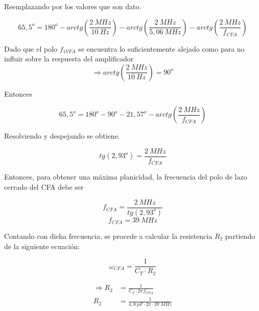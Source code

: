 \bigskip
\hspace{1mm} Reemplazando por los valores que son dato.

\begin{equation}
    65,5^o = 180^o - arctg \left(\frac{2~MHz}{10~Hz}\right) - arctg \left(\frac{2~MHz}{5,06~MHz}\right) - arctg \left(\frac{2~MHz}{f_{CFA}}\right)
\end{equation}

\bigskip
\hspace{1mm} Dado que el polo $ f_{1VFA} $ se encuentra lo suficientemente alejado como para no influir sobre la respuesta del amplificador
\begin{equation}
    \Longrightarrow arctg \left(\frac{2~MHz}{10~Hz}\right) = 90^o
\end{equation}

\hspace{1mm} Entonces

\begin{equation}
    65,5^o = 180^o - 90^o - 21,57^o - arctg \left(\frac{2~MHz}{f_{CFA}}\right)
\end{equation}

\bigskip
\hspace{1mm} Resolviendo y despejando se obtiene.

\begin{equation}
    tg (2,93^o) = \frac{2~MHz}{f_{CFA}}
\end{equation}

\bigskip
\hspace{1mm} Entonces, para obtener una máxima planicidad, la frecuencia del polo de lazo cerrado del CFA debe ser

\begin{equation}
    f_{CFA} = \frac{2~MHz}{tg (2,93^o)}
\end{equation}
\begin{equation}
     \boxed{
        f_{CFA} = 39~MHz
    }
\end{equation}

\bigskip
\hspace{1mm} Contando con dicha frecuencia, se procede a calcular la resistencia $ R_2 $ partiendo de la siguiente ecuación:

\begin{equation}
    \omega _{CFA} = \frac{1}{C_T \cdot R_2}
\end{equation}


\begin{align}
   \Longrightarrow R_2 &= \frac{1}{C_T \cdot 2\pi f_{CFA}}
    \\
    R_2 &= \frac{1}{4,8~pF \cdot 2\pi \cdot 39~MHz}
\end{align}

